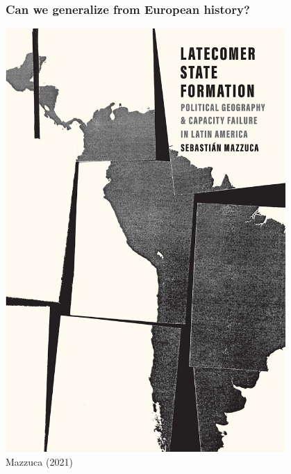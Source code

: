 \documentclass[aspectratio=43]{beamer}
\begin{document}
\begin{frame}
\frametitle{Can we generalize from European history?}
\centering

\begin{minipage}{0.6\textwidth}\centering
  \begin{itemize}
  \end{itemize}
\end{minipage}\hfill
\begin{minipage}{0.4\textwidth}\centering
  \includegraphics[width = 0.8\textwidth]{img/mazzuca_book}\\
  {\small Mazzuca (2021)}
\end{minipage}

\end{frame}
\end{document}
